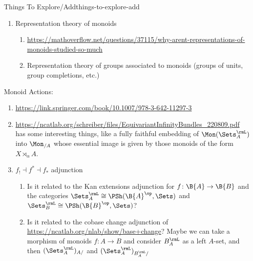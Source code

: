 \begin{remark}{Things To Explore/Add}{things-to-explore-add}
\begin{enumerate}
\begin{enumerate}
\begin{itemize}
\begin{align*}
                                x_{1}a_{2}    = x_{2}a_{3},\\
                                a_{2m-1}y_{m} = a_{2m}
                            \end{align*}
                            such that, for each $1\leq i\leq m$, we have $a_{i}\in\Im(f)$.
                    \end{itemize}
            \end{enumerate}
            Wikipedia says in \url{https://en.wikipedia.org/wiki/Isbell\%27s\_zigzag\_theorem}:
            \begin{quote}
                For monoids, this theorem can be written more concisely:
            \end{quote}
        \item Representation theory of monoids
            \begin{enumerate}
                \item \url{https://mathoverflow.net/questions/37115/why-arent-representations-of-monoids-studied-so-much}
                \item Representation theory of groups associated to monoids (groups of units, group completions, etc.)
            \end{enumerate}
    \end{enumerate}
    Monoid Actions:
    \begin{enumerate}
        \item \url{https://link.springer.com/book/10.1007/978-3-642-11297-3}
        \item \url{https://ncatlab.org/schreiber/files/EquivariantInfinityBundles_220809.pdf} has some interesting things, like a fully faithful embedding of $\Mon(\Sets^{\rmL}_{A})$ into $\Mon_{/A}$ whose essential image is given by those monoids of the form $X\rtimes_{\alpha}A$.
        \item $f_{!}\dashv f^{*}\dashv f_{*}$ adjunction
            \begin{enumerate}
                \item Is it related to the Kan extensions adjunction for $f\colon\B{A}\to\B{B}$ and the categories $\Sets^{\rmL}_{A}\cong\PSh(\B{A}^{\op},\Sets)$ and $\Sets^{\rmL}_{B}\cong\PSh(\B{B}^{\op},\Sets)$?
                \item Is it related to the cobase change adjunction of \url{https://ncatlab.org/nlab/show/base+change}? Maybe we can take a morphism of monoids $f\colon A\to B$ and consider $B^{\rmL}_{A}$ as a left $A$-set, and then $(\Sets^{\rmL}_{A})_{A/}$ and $(\Sets^{\rmL}_{A})_{B^{\rmL}_{A}/}$

\end{enumerate}
\end{enumerate}
\end{remark}
